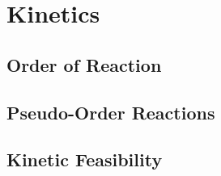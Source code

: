 \documentclass[../main]{subfiles}
\begin{document}
\section{Kinetics}

\subsection{Order of Reaction}

\subsection{Pseudo-Order Reactions}

\subsection{Kinetic Feasibility}
\end{document}

